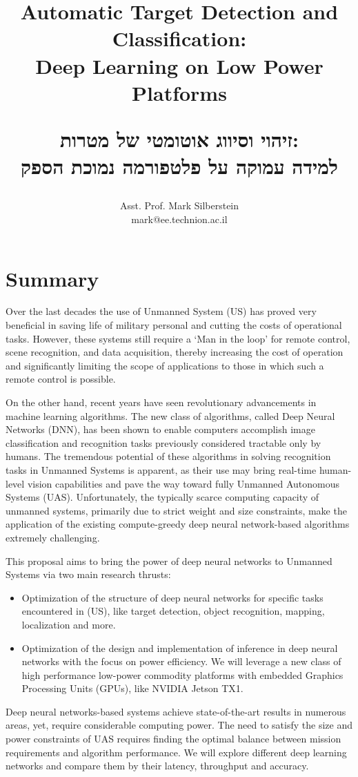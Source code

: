 \documentclass{article} %
\title{Automatic Target Detection and Classification: \\
  Deep Learning on Low Power Platforms \\
  \begin{otherlanguage}{hebrew}
    זיהוי וסיווג אוטומטי של מטרות: \\
    למידה עמוקה על פלטפורמה נמוכת הספק
  \end{otherlanguage}
}
\author{
  Asst. Prof. Mark Silberstein \\
  mark@ee.technion.ac.il\\
}
\begin{document}
\maketitle

\section{Summary}

Over the last decades the use of Unmanned System (US) has proved very beneficial
in saving life of military personal and cutting the costs of operational tasks.
However, these systems still require a `Man in the loop' for remote control,
scene recognition, and data acquisition, thereby increasing the cost of
operation and significantly limiting the scope of applications to those in which
such a remote control is possible.

On the other hand, recent years have seen revolutionary advancements in machine
learning algorithms. The new class of algorithms, called Deep Neural Networks
(DNN), has been shown to enable computers accomplish image classification and
recognition tasks previously considered tractable only by humans. The tremendous
potential of these algorithms in solving recognition tasks in Unmanned Systems
is apparent, as their use may bring real-time human-level vision capabilities
and pave the way toward fully Unmanned Autonomous Systems (UAS). Unfortunately,
the typically scarce computing capacity of unmanned systems, primarily due to
strict weight and size constraints, make the application of the existing
compute-greedy deep neural network-based algorithms extremely challenging.

This proposal aims to bring the power of deep neural networks to Unmanned
Systems via two main research thrusts:

\begin{itemize}
\item Optimization of the structure of deep neural networks for specific
	tasks encountered in (US), like target detection, object recognition,
	mapping, localization and more.
\item Optimization of the design and implementation of inference in deep neural
	networks with the focus on power efficiency. We will leverage a new  class of high
	performance low-power commodity platforms with embedded Graphics
	Processing Units (GPUs), like  NVIDIA Jetson TX1.
\end{itemize}

Deep neural networks-based systems achieve  state-of-the-art results in numerous
areas, yet, require considerable computing power. The need to satisfy the size and
power constraints of UAS requires finding the optimal balance between
mission requirements and algorithm performance. We will explore different
deep learning networks and compare them by their latency, throughput and
accuracy.
\end{document}
